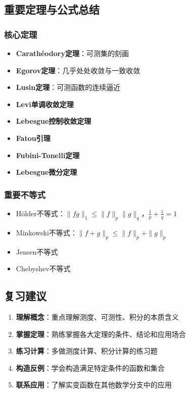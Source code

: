 \subsection{重要定理与公式总结}

\subsubsection{核心定理}
\begin{itemize}
    \item \textbf{Carathéodory定理}：可测集的刻画
    \item \textbf{Egorov定理}：几乎处处收敛与一致收敛
    \item \textbf{Lusin定理}：可测函数的连续逼近
    \item \textbf{Levi单调收敛定理}
    \item \textbf{Lebesgue控制收敛定理}
    \item \textbf{Fatou引理}
    \item \textbf{Fubini-Tonelli定理}
    \item \textbf{Lebesgue微分定理}
\end{itemize}

\subsubsection{重要不等式}
\begin{itemize}
    \item Hölder不等式：$\|fg\|_1 \leq \|f\|_p \|g\|_q$，$\frac{1}{p} + \frac{1}{q} = 1$
    \item Minkowski不等式：$\|f+g\|_p \leq \|f\|_p + \|g\|_p$
    \item Jensen不等式
    \item Chebyshev不等式
\end{itemize}

\subsection{复习建议}

\begin{enumerate}
    \item \textbf{理解概念}：重点理解测度、可测性、积分的本质含义
    \item \textbf{掌握定理}：熟练掌握各大定理的条件、结论和应用场合
    \item \textbf{练习计算}：多做测度计算、积分计算的练习题
    \item \textbf{构造反例}：学会构造满足特定条件的函数和集合
    \item \textbf{联系应用}：了解实变函数在其他数学分支中的应用
\end{enumerate}
